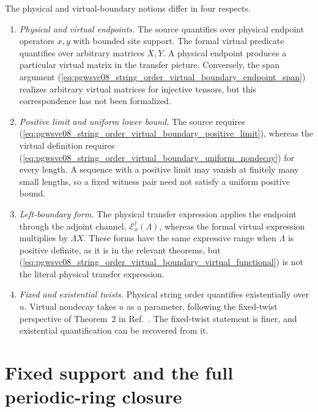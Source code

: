 \documentclass[11pt]{article}
\begin{document}
The physical and virtual-boundary notions differ in four respects.

\begin{enumerate}
    \item
          \emph{Physical and virtual endpoints.}
          The source quantifies over physical endpoint operators $x,y$ with
          bounded site support. The formal virtual predicate quantifies over
          arbitrary matrices $X,Y$. A physical endpoint produces a particular
          virtual matrix in the transfer picture. Conversely, the span
          argument
          (\ref{eq:pgwsvc08_string_order_virtual_boundary_endpoint_span})
          realizes arbitrary virtual matrices for injective tensors, but this
          correspondence has not been formalized.

    \item
          \emph{Positive limit and uniform lower bound.}
          The source requires
          (\ref{eq:pgwsvc08_string_order_virtual_boundary_positive_limit}),
          whereas the virtual definition requires
          (\ref{eq:pgwsvc08_string_order_virtual_boundary_uniform_nondecay})
          for every length. A sequence with a positive limit may vanish at
          finitely many small lengths, so a fixed witness pair need not satisfy
          a uniform positive bound.

    \item
          \emph{Left-boundary form.}
          The physical transfer expression applies the endpoint through the
          adjoint channel, $\mathcal{E}_x^\dagger(\Lambda)$, whereas the formal
          virtual expression multiplies by $\Lambda X$. These forms have the
          same expressive range when $\Lambda$ is positive definite, as it is
          in the relevant theorems, but
          (\ref{eq:pgwsvc08_string_order_virtual_boundary_virtual_functional})
          is not the literal physical transfer expression.

    \item
          \emph{Fixed and existential twists.}
          Physical string order quantifies existentially over $u$. Virtual
          nondecay takes $u$ as a parameter, following the fixed-twist
          perspective of Theorem~2 in
          Ref.~\cite{PerezGarcia2008StringOrder}. The fixed-twist statement is
          finer, and existential quantification can be recovered from it.
\end{enumerate}

\section{Fixed support and the full periodic-ring closure}
\end{document}
